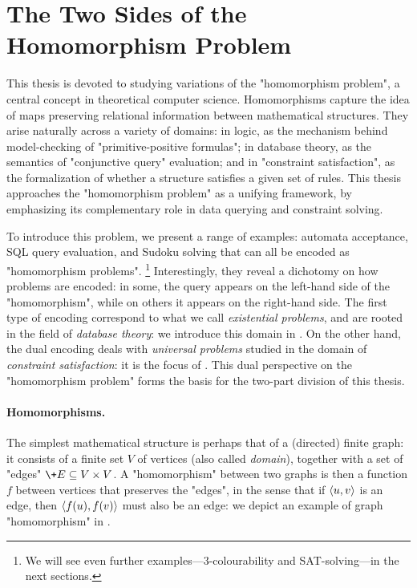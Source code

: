 \section{The Two Sides of the Homomorphism Problem}

This thesis is devoted to studying variations of the "homomorphism problem",
a central concept in theoretical computer science.
Homomorphisms capture the idea of maps preserving relational information between mathematical structures.
They arise naturally across a variety of domains: in logic, as the mechanism behind model-checking of "primitive-positive formulas"; in database theory, as the semantics of "conjunctive query" evaluation; and in "constraint satisfaction", as the formalization of whether a structure
satisfies a given set of rules. This thesis approaches the "homomorphism problem" as a unifying framework, by emphasizing its complementary role in data querying and constraint solving.

To introduce this problem, we present a range of examples: automata acceptance, SQL query evaluation, and Sudoku solving that can all be encoded as "homomorphism problems".%
\footnote{We will see even further examples---3-colourability and SAT-solving---in the next sections.}
Interestingly, they reveal a dichotomy on how problems are encoded:
in some, the query appears on the left-hand side of the "homomorphism", 
while on others it appears on the right-hand side.
The first type of encoding correspond to what we call \emph{existential problems},
and are rooted in the field of \emph{database theory}:
we introduce this domain in .
On the other hand, the dual encoding deals with \emph{universal problems}
studied in the domain of \emph{constraint satisfaction}:
it is the focus of .
This dual perspective on the "homomorphism problem"
forms the basis for the two-part division of this thesis.

\paragraph*{Homomorphisms.}
The simplest mathematical structure is perhaps that of a (directed) finite graph:
it consists of a finite set $V$ of vertices (also called \emph{domain}),
together with a set of "edges" $\+E \subseteq V \times V$.
A "homomorphism" between two graphs is then a
function $f$ between vertices that preserves
the "edges", in the sense that if $\langle u,v\rangle$ is an edge, then
$\langle f(u),f(v)\rangle$ must also be an edge: we depict
an example of graph "homomorphism" in .

